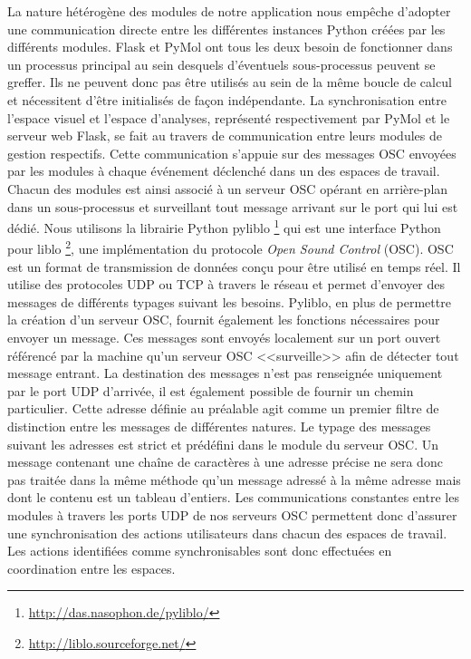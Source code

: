 La nature hétérogène des modules de notre application nous empêche d'adopter une communication directe entre les différentes instances Python créées par les différents modules. Flask et PyMol ont tous les deux besoin de fonctionner dans un processus principal au sein desquels d'éventuels sous-processus peuvent se greffer. Ils ne peuvent donc pas être utilisés au sein de la même boucle de calcul et nécessitent d'être initialisés de façon indépendante. La synchronisation entre l'espace visuel et l'espace d'analyses, représenté respectivement par PyMol et le serveur web Flask, se fait au travers de communication entre leurs modules de gestion respectifs. Cette communication s'appuie sur des messages OSC envoyées par les modules à chaque événement déclenché dans un des espaces de travail. Chacun des modules est ainsi associé à un serveur OSC opérant en arrière-plan dans un sous-processus et surveillant tout message arrivant sur le port qui lui est dédié. Nous utilisons la librairie Python pyliblo \footnote{\url{http://das.nasophon.de/pyliblo/}} qui est une interface Python pour liblo \footnote{\url{http://liblo.sourceforge.net/}}, une implémentation du protocole \textit{Open Sound Control} (OSC). OSC est un format de transmission de données conçu pour être utilisé en temps réel. Il utilise des protocoles UDP ou TCP à travers le réseau et permet d'envoyer des messages de différents typages suivant les besoins. Pyliblo, en plus de permettre la création d'un serveur OSC, fournit également les fonctions nécessaires pour envoyer un message. Ces messages sont envoyés localement sur un port ouvert référencé par la machine qu'un serveur OSC <<surveille>> afin de détecter tout message entrant. La destination des messages n'est pas renseignée uniquement par le port UDP d'arrivée, il est également possible de fournir un chemin particulier. Cette adresse définie au préalable agit comme un premier filtre de distinction entre les messages de différentes natures. Le typage des messages suivant les adresses est strict et prédéfini dans le module du serveur OSC. Un message contenant une chaîne de caractères à une adresse précise ne sera donc pas traitée dans la même méthode qu'un message adressé à la même adresse mais dont le contenu est un tableau d'entiers.
Les communications constantes entre les modules à travers les ports UDP de nos serveurs OSC permettent donc d'assurer une synchronisation des actions utilisateurs dans chacun des espaces de travail. Les actions identifiées comme synchronisables sont donc effectuées en coordination entre les espaces.
